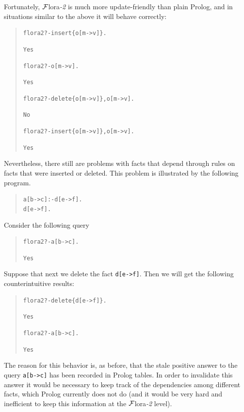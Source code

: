 \documentclass[11pt]{article}
\newcommand{\FLSYSTEM}{{\mbox{\sc ${\cal F}${lora}\rm\emph{-2}}}\xspace}
\newcommand{\prompt}{flora2 ?- }
\begin{document}
Fortunately, \FLSYSTEM is much more update-friendly than plain Prolog, and in
situations similar to the above it will behave correctly:
\begin{quote}
\begin{alltt}
\prompt insert\{o[m->v]\}.

Yes

\prompt o[m->v].

Yes

\prompt delete\{o[m->v]\}, o[m->v].

No

\prompt insert\{o[m->v]\}, o[m->v].

Yes
\end{alltt}
\end{quote}
Nevertheless, there still are problems with facts that
depend through rules on facts that were inserted or deleted.  This
problem is illustrated by the following program.
\begin{quote}
\begin{alltt}
a[b->c] :- d[e->f].  
d[e->f].
\end{alltt}
\end{quote}
Consider the following query
\begin{quote}
\begin{alltt}
\prompt a[b->c].

Yes
\end{alltt}
\end{quote}
Suppose that next we delete the fact {\tt d[e->f]}. Then we will get the
following counterintuitive results:
\begin{quote}
\begin{alltt}
\prompt delete\{d[e->f]\}.

Yes

\prompt a[b->c].

Yes
\end{alltt}
\end{quote}
The reason for this behavior is, as before, that the stale positive
answer to the query {\tt a[b->c]} has been recorded in Prolog tables.
In order to invalidate this answer it would be necessary to keep 
track of the dependencies among different facts, which Prolog currently
does not do (and it would be very hard and inefficient to keep this
information at the \FLSYSTEM level).
\end{document}
